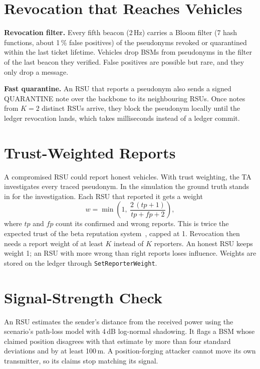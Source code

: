 \section{Revocation that Reaches Vehicles}

\textbf{Revocation filter.} Every fifth beacon (2\,Hz) carries a Bloom filter (7 hash functions, about 1\,\% false positives) of the pseudonyms
revoked or quarantined within the last ticket lifetime. Vehicles drop BSMs from pseudonyms in the
filter of the last beacon they verified. False positives are possible but rare, and they only drop
a message.

\textbf{Fast quarantine.} An RSU that reports a pseudonym also sends a signed QUARANTINE note over
the backbone to its neighbouring RSUs. Once notes from $K = 2$ distinct RSUs arrive, they block the
pseudonym locally until the ledger revocation lands, which takes milliseconds instead of a ledger
commit.

\section{Trust-Weighted Reports}\label{sec:trust}

A compromised RSU could report honest vehicles. With trust weighting, the TA investigates every
traced pseudonym. In the simulation the ground truth stands in for the investigation. Each RSU that
reported it gets a weight
\begin{equation}
  w = \min\!\left(1,\ \frac{2\,(\mathit{tp}+1)}{\mathit{tp}+\mathit{fp}+2}\right),
\end{equation}
where $\mathit{tp}$ and $\mathit{fp}$ count its confirmed and wrong reports. This is twice the expected
trust of the beta reputation system~\cite{josang2002beta}, capped at 1. Revocation then needs a
report weight of at least $K$ instead of $K$ reporters. An honest RSU keeps weight 1; an RSU with more
wrong than right reports loses influence. Weights are stored on the ledger through
\texttt{SetReporterWeight}.

\section{Signal-Strength Check}

An RSU estimates the sender's distance from the received power using the scenario's path-loss model
with 4\,dB log-normal shadowing. It flags a BSM whose claimed position disagrees with that estimate
by more than four standard deviations and by at least 100\,m. A position-forging attacker cannot
move its own transmitter, so its claims stop matching its signal.

